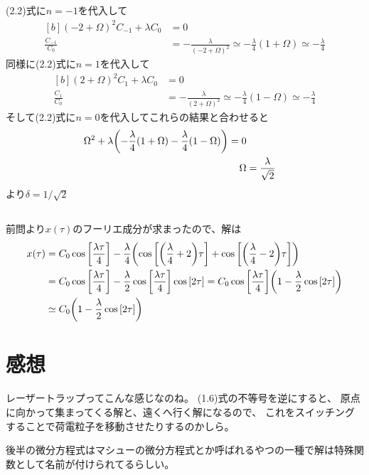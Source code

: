 \documentclass[../ap_2023.tex]{subfiles}
\begin{document}
\subsection{}
(2.2)式に\(n=-1\)を代入して
\begin{equation}\begin{aligned}[b]
    (-2+\Omega)^2C_{-1}+\lambda C_0 &=0\\
    \frac{C_{-1}}{C_0} &= -\frac{\lambda}{(-2+\Omega)^2}
        \simeq -\frac{\lambda}{4}(1+\Omega)
        \simeq -\frac{\lambda}{4}
\end{aligned}\end{equation}
同様に(2.2)式に\(n=1\)を代入して
\begin{equation}\begin{aligned}[b]
    (2+\Omega)^2C_{1}+\lambda C_0 &=0\\
    \frac{C_{1}}{C_0} &= -\frac{\lambda}{(2+\Omega)^2}
        \simeq -\frac{\lambda}{4}(1-\Omega)
        \simeq -\frac{\lambda}{4}
\end{aligned}\end{equation}
そして(2.2)式に\(n=0\)を代入してこれらの結果と合わせると
\begin{equation}\begin{aligned}[b]
    \Omega^2+\lambda\qty(-\frac{\lambda}{4}(1+\Omega)-\frac{\lambda}{4}(1-\Omega)) = 0\\
    \Omega&=\frac{\lambda}{\sqrt{2}}
\end{aligned}\end{equation}
より\(\delta=1/\sqrt{2}\)

\subsection{}
前問より\(x(\tau)\)のフーリエ成分が求まったので、解は
\begin{equation}\begin{aligned}[b]
    x(\tau) &= C_0\cos\qty[\frac{\lambda\tau}{4}]-\frac{\lambda}{4}\qty(\cos\qty[\qty(\frac{\lambda}{4}+2)\tau]+\cos\qty[\qty(\frac{\lambda}{4}-2)\tau])\\
    &= C_0\cos\qty[\frac{\lambda\tau}{4}]-\frac{\lambda}{2}\cos\qty[\frac{\lambda\tau}{4}]\cos\qty[2\tau]
        = C_0\cos\qty[\frac{\lambda\tau}{4}]\qty(1-\frac{\lambda}{2}\cos\qty[2\tau])\\
    &\simeq C_0\qty(1-\frac{\lambda}{2}\cos\qty[2\tau])
\end{aligned}\end{equation}

\section*{感想}
レーザートラップってこんな感じなのね。
(1.6)式の不等号を逆にすると、
原点に向かって集まってくる解と、遠くへ行く解になるので、
これをスイッチングすることで荷電粒子を移動させたりするのかしら。

後半の微分方程式はマシューの微分方程式とか呼ばれるやつの一種で解は特殊関数として名前が付けられてるらしい。
\end{document}
